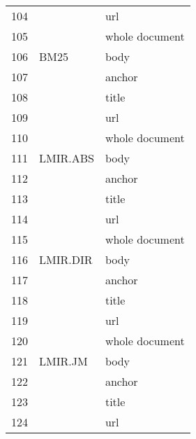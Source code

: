 \begin{longtable}{cll}
104        &                                                     & url            \\
105        &                                                     & whole document \\
\midrule106        & BM25                                                & body           \\
107        &                                                     & anchor         \\
108        &                                                     & title          \\
109        &                                                     & url            \\
110        &                                                     & whole document \\
\midrule111        & LMIR.ABS                                            & body           \\
112        &                                                     & anchor         \\
113        &                                                     & title          \\
114        &                                                     & url            \\
115        &                                                     & whole document \\
\midrule116        & LMIR.DIR                                            & body           \\
117        &                                                     & anchor         \\
118        &                                                     & title          \\
119        &                                                     & url            \\
120        &                                                     & whole document \\
\midrule121        & LMIR.JM                                             & body           \\
122        &                                                     & anchor         \\
123        &                                                     & title          \\
124        &                                                     & url            \\

\end{longtable}
